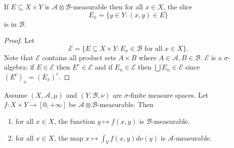 \documentclass[a4paper]{article}
\begin{document}
\begin{lemma}
  If \(E \subseteq X \times Y\) is \(\mathcal A \otimes \mathcal B\)-measurable then for all \(x \in X\), the slice
  \[
    E_x = \{y \in Y: (x, y) \in E\}
  \]
  is in \(\mathcal B\).
\end{lemma}

\begin{proof}
  Let
  \[
    \mathcal E = \{E \subseteq X \times Y: E_x \in \mathcal B \text{ for all } x \in X\}.
  \]
  Note that \(\mathcal E\) contains all product sets \(A \times B\) where \(A \in \mathcal A, B \in \mathcal B\). \(\mathcal E\) is a \(\sigma\)-algebra: if \(E \in \mathcal E\) then \(E^c \in \mathcal E\) and if \(E_n \in \mathcal E\) then \(\bigcup E_n \in \mathcal E\) since \((E^c)_x = (E_x)^c\).
\end{proof}

\begin{lemma}
  Assume \((X, \mathcal A, \mu)\) and \((Y, \mathcal B, \nu)\) are \(\sigma\)-finite measure spaces. Let \(f: X \times Y \to [0, +\infty]\) be \(\mathcal A \otimes \mathcal B\)-measurable. Then
  \begin{enumerate}
  \item for all \(x \in X\), the function \(y \mapsto f(x, y)\) is \(\mathcal B\)-measurable.
  \item for all \(x \in X\), the map \(x \mapsto \int_Y f(x, y) d\nu(y)\) is \(\mathcal A\)-measurable.
  \end{enumerate}
\end{lemma}
\end{document}
